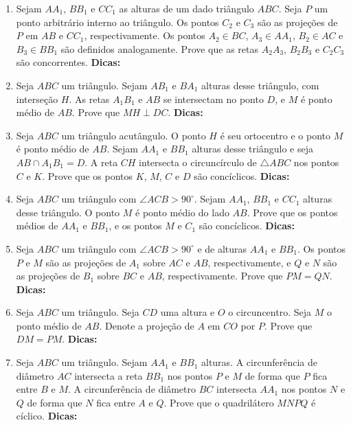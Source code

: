 \documentclass{article}
\newcommand{\dica}{\textbf{Dicas:}}
\newcommand{\iniTri}{Seja $ABC$ um triângulo}
\begin{document}
\begin{multicols}{2}
\begin{enumerate}
    \item Sejam $AA_1$, $BB_1$ e $CC_1$ as alturas de um dado triângulo $ABC$. Seja $P$ um ponto arbitrário interno ao triângulo. Os pontos $C_2$ e $C_3$ são as projeções de $P$ em $AB$ e $CC_1$, respectivamente. Os pontos $A_2\in BC$, $A_3\in AA_1$, $B_2\in AC$ e $B_3\in BB_1$ são definidos analogamente. Prove que as retas $A_2A_3$, $B_2B_3$ e $C_2C_3$ são concorrentes. \dica %
    
    \item \iniTri. Sejam $AB_1$ e $BA_1$ alturas desse triângulo, com interseção $H$. As retas $A_1B_1$ e $AB$ se intersectam no ponto $D$, e $M$ é ponto médio de $AB$. Prove que $MH\perp DC$. \dica %
    
    \item Seja $ABC$ um triângulo acutângulo. O ponto $H$ é seu ortocentro e o ponto $M$ é ponto médio de $AB$. Sejam $AA_1$ e $BB_1$ alturas desse triângulo e seja $AB\cap A_1B_1=D$. A reta $CH$ intersecta o circuncírculo de $\triangle ABC$ nos pontos $C$ e $K$. Prove que os pontos $K$, $M$, $C$ e $D$ são concíclicos. \dica %
    
    \item Seja $ABC$ um triângulo com $\angle ACB>90^{\circ}$. Sejam $AA_1$, $BB_1$ e $CC_1$ alturas desse triângulo. O ponto $M$ é ponto médio do lado $AB$. Prove que os pontos médios de $AA_1$ e $BB_1$, e os pontos $M$ e $C_1$ são concíclicos. \dica %
    
    \item Seja $ABC$ um triângulo com $\angle ACB>90^{\circ}$ e de alturas $AA_1$ e $BB_1$. Os pontos $P$ e $M$ são as projeções de $A_1$ sobre $AC$ e $AB$, respectivamente, e $Q$ e $N$ são as projeções de $B_1$ sobre $BC$ e $AB$, respectivamente. Prove que $PM=QN$. \dica %
    
    \item \iniTri. Seja $CD$ uma altura e $O$ o circuncentro. Seja $M$ o ponto médio de $AB$. Denote a projeção de $A$ em $CO$ por $P$. Prove que $DM=PM$. \dica %
    
    \item \iniTri. Sejam $AA_1$ e $BB_1$ alturas. A circunferência de diâmetro $AC$ intersecta a reta $BB_1$ nos pontos $P$ e $M$ de forma que $P$ fica entre $B$ e $M$. A circunferência de diâmetro $BC$ intersecta $AA_1$ nos pontos $N$ e $Q$ de forma que $N$ fica entre $A$ e $Q$. Prove que o quadrilátero $MNPQ$ é cíclico. \dica %
    

\end{enumerate}
\end{multicols}
\end{document}
